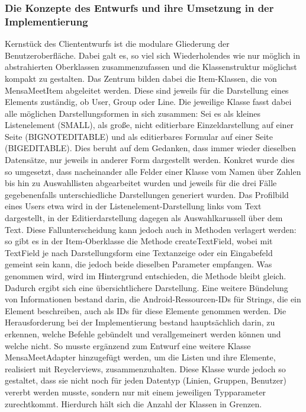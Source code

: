 \documentclass[a4paper]{scrreprt}
\begin{document}
\subsubsection{Die Konzepte des Entwurfs und ihre Umsetzung in der Implementierung}
Kernstück des Cliententwurfs ist die modulare Gliederung der Benutzeroberfläche. Dabei galt es, so viel sich Wiederholendes wie nur möglich in abstrahierten Oberklassen zusammenzufassen und die Klassenstruktur möglichst kompakt zu gestalten. Das Zentrum bilden dabei die Item-Klassen, die von MensaMeetItem abgeleitet werden. Diese sind jeweils für die Darstellung eines Elements zuständig, ob User, Group oder Line. Die jeweilige Klasse fasst dabei alle möglichen Darstellungsformen in sich zusammen: Sei es als kleines Listenelement (SMALL), als große, nicht editierbare Einzeldarstellung auf einer Seite (BIGNOTEDITABLE) und als editierbares Formular auf einer Seite (BIGEDITABLE). Dies beruht auf dem Gedanken, dass immer wieder dieselben Datensätze, nur jeweils in anderer Form dargestellt werden. 
Konkret wurde dies so umgesetzt, dass nacheinander alle Felder einer Klasse vom Namen über Zahlen bis hin zu Auswahllisten abgearbeitet wurden und jeweils für die drei Fälle gegebenenfalls unterschiedliche Darstellungen generiert wurden. Das Profilbild eines Users etwa wird in der Listenelement-Darstellung links vom Text dargestellt, in der Editierdarstellung dagegen als Auswahlkarussell über dem Text. Diese Fallunterscheidung kann jedoch auch in Methoden verlagert werden: so gibt es in der Item-Oberklasse die Methode createTextField, wobei mit TextField je nach Darstellungsform eine Textanzeige oder ein Eingabefeld gemeint sein kann, die jedoch beide dieselben Parameter empfangen. Was genommen wird, wird im Hintergrund entschieden, die Methode bleibt gleich. Dadurch ergibt sich eine übersichtlichere Darstellung. 
Eine weitere Bündelung von Informationen bestand darin, die Android-Ressourcen-IDs für Strings, die ein Element beschreiben, auch als IDs für diese Elemente genommen werden. Die Herausforderung bei der Implementierung bestand hauptsächlich darin, zu erkennen, welche Befehle gebündelt und verallgemeinert werden können und welche nicht. So musste ergänzend zum Entwurf eine weitere Klasse MensaMeetAdapter hinzugefügt werden, um die Listen und ihre Elemente, realisiert mit Reyclerviews, zusammenzuhalten. Diese Klasse wurde jedoch so gestaltet, dass sie nicht noch für jeden Datentyp (Linien, Gruppen, Benutzer) vererbt werden musste, sondern nur mit einem jeweiligen Typparameter zurechtkommt. Hierdurch hält sich die Anzahl der Klassen in Grenzen.
\end{document}
